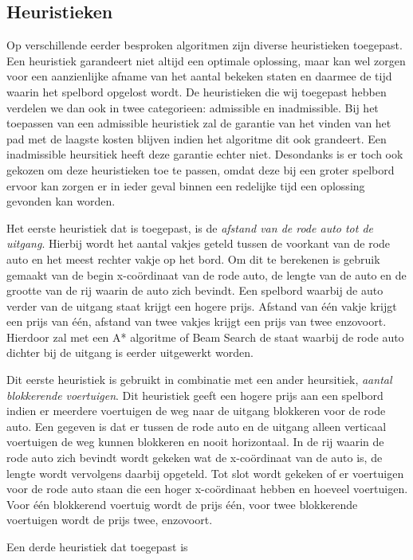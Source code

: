 \documentclass[a4paper]{article}
\begin{document}
\subsection{Heuristieken}
Op verschillende eerder besproken algoritmen zijn diverse heuristieken toegepast. Een heuristiek garandeert niet altijd een optimale oplossing, maar kan wel zorgen voor een aanzienlijke afname van het aantal bekeken staten en daarmee de tijd waarin het spelbord opgelost wordt. De heuristieken die wij toegepast hebben verdelen we dan ook in twee categorieen: admissible en inadmissible. Bij het toepassen van een admissible heuristiek zal de garantie van het vinden van het pad met de laagste kosten blijven indien het algoritme dit ook grandeert. Een inadmissible heursitiek heeft deze garantie echter niet. Desondanks is er toch ook gekozen om deze heuristieken toe te passen, omdat deze bij een groter spelbord ervoor kan zorgen er in ieder geval binnen een redelijke tijd een oplossing gevonden kan worden.
	
    Het eerste heuristiek dat is toegepast, is de \textit{afstand van de rode auto tot de uitgang}. Hierbij wordt het aantal vakjes geteld tussen de voorkant van de rode auto en het meest rechter vakje op het bord. Om dit te berekenen is gebruik gemaakt van de begin x-coördinaat van de rode auto, de lengte van de auto en de grootte van de rij waarin de auto zich bevindt. Een spelbord waarbij de auto verder van de uitgang staat krijgt een hogere prijs. Afstand van één vakje krijgt een prijs van één, afstand van twee vakjes krijgt een prijs van twee enzovoort. Hierdoor zal met een A* algoritme of Beam Search de staat waarbij de rode auto dichter bij de uitgang is eerder uitgewerkt worden. 

	Dit eerste heuristiek is gebruikt in combinatie met een ander heursitiek, \textit{aantal blokkerende voertuigen}. Dit heuristiek geeft een hogere prijs aan een spelbord indien er meerdere voertuigen de weg naar de uitgang blokkeren voor de rode auto. Een gegeven is dat er tussen de rode auto en de uitgang alleen verticaal voertuigen de weg kunnen blokkeren en nooit horizontaal. In de rij waarin de rode auto zich bevindt wordt gekeken wat de x-coördinaat van de auto is, de lengte wordt vervolgens daarbij opgeteld. Tot slot wordt gekeken of er voertuigen voor de rode auto staan die een hoger x-coördinaat hebben en hoeveel voertuigen. Voor één blokkerend voertuig wordt de prijs één, voor twee blokkerende voertuigen wordt de prijs twee, enzovoort.
    
    Een derde heuristiek dat toegepast is 
    
\end{document}
